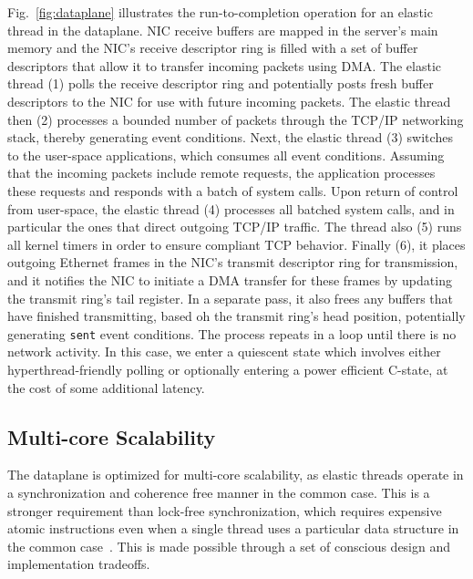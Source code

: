 % 

Fig.~\ref{fig:dataplane} illustrates the run-to-completion operation
for an elastic thread in the \ix dataplane. NIC receive buffers are
mapped in the server's main memory and the NIC's receive descriptor
ring is filled with a set of buffer descriptors that allow it to
transfer incoming packets using DMA\@.  The elastic thread (1) polls
the receive descriptor ring and potentially posts fresh buffer
descriptors to the NIC for use with future incoming packets. The
elastic thread then (2) processes a bounded number of packets through
the TCP/IP networking stack, thereby generating event
conditions. Next, the elastic thread (3) switches to the user-space
applications, which consumes all event conditions. Assuming that the
incoming packets include remote requests, the application processes
these requests and responds with a batch of system calls. Upon return
of control from user-space, the elastic thread (4) processes all batched
system calls, and in particular the ones that direct outgoing TCP/IP
traffic. The thread also (5) runs all kernel timers in order to ensure
compliant TCP behavior. Finally (6), it places outgoing Ethernet
frames in the NIC's transmit descriptor ring for transmission, and it
notifies the NIC to initiate a DMA transfer for these frames by
updating the transmit ring's tail register. In a separate pass, it
also frees any buffers that have finished transmitting, based oh the
transmit ring's head position, potentially generating \texttt{sent}
event conditions.  The process repeats in a loop until there is no
network activity. In this case, we enter a quiescent state which
involves either hyperthread-friendly polling or optionally entering a
power efficient C-state, at the cost of some additional latency.


\subsection{Multi-core Scalability}
\label{sec:impl:cohfree}

The \ix dataplane is optimized for multi-core scalability, as elastic
threads operate in a synchronization and coherence free manner in the
common case. This is a stronger requirement than lock-free
synchronization, which requires expensive atomic instructions even
when a single thread uses a particular data structure in the common
case~\cite{DBLP:conf/sosp/DavidGT13}.  This is made possible through a
set of conscious design and implementation tradeoffs.

